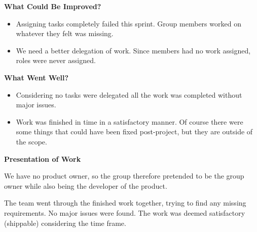 \textbf{What Could Be Improved?}

\begin{itemize}
	\item Assigning tasks completely failed this sprint. Group members worked on whatever they felt was missing.
	\item We need a better delegation of work. Since members had no work assigned, roles were never assigned.
\end{itemize}

\textbf{What Went Well?}

\begin{itemize}
	\item Considering no tasks were delegated all the work was completed without major issues. 
	\item Work was finished in time in a satisfactory manner. Of course there were some things that could have been fixed post-project, but they are outside of the scope. 
\end{itemize}

\textbf{Presentation of Work}

We have no product owner, so the group therefore pretended to be the group owner while also being the developer of the product.

The team went through the finished work together, trying to find any missing requirements. 
No major issues were found. The work was deemed satisfactory (shippable) considering the time frame.
